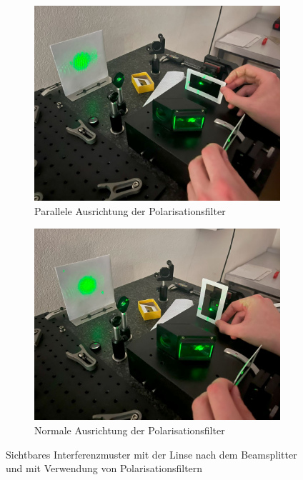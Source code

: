 \documentclass[12pt,english,ngerman]{scrartcl}
\begin{document}
\begin{figure}[H]
	\centering
	\begin{subfigure}{.45\linewidth}
		\includegraphics[width=\textwidth]{./figures/Interferometer_polarisation_parallel.JPG}
		\caption{Parallele Ausrichtung der Polarisationsfilter
		}\label{fig:interferometer_polarisation_parallel}
	\end{subfigure}
	\begin{subfigure}{.45\linewidth}
		\includegraphics[width=\textwidth]{./figures/Interferometer_polarisation_normal.JPG}
		\caption{Normale Ausrichtung der Polarisationsfilter
		}\label{fig:interferometer_polarisation_normal}
	\end{subfigure}
	\caption[Sichtbares Interferenzmuster mit der Linse nach dem Beamsplitter und mit Verwendung von Polarisationsfiltern]
	{Sichtbares Interferenzmuster mit der Linse nach dem Beamsplitter und mit Verwendung von Polarisationsfiltern
	}\label{fig:interferometer_polarisation}
\end{figure}
\end{document}
